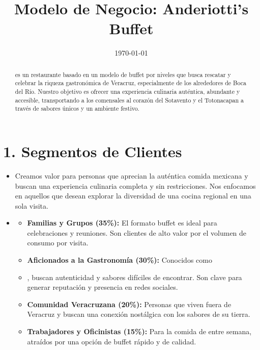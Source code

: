 \documentclass[12pt, letterpaper, twocolumn]{article}
\title{\textbf{Modelo de Negocio: Anderiotti's Buffet}}
\date{\today}
\newcommand{\textit}[1]{\item[\textbf{--- #1}]} %
\begin{document}
\maketitle
\thispagestyle{empty}

\begin{abstract}
\noindent\textit{Anderiotti's Buffet} es un restaurante basado en un modelo de buffet por niveles que busca rescatar y celebrar la riqueza gastronómica de Veracruz, especialmente de los alrededores de Boca del Río. Nuestro objetivo es ofrecer una experiencia culinaria auténtica, abundante y accesible, transportando a los comensales al corazón del Sotavento y el Totonacapan a través de sabores únicos y un ambiente festivo.
\end{abstract}



\section*{1. Segmentos de Clientes}

\begin{itemize}
    \textit{¿Para quién creas valor?}
    Creamos valor para personas que aprecian la auténtica comida mexicana y buscan una experiencia culinaria completa y sin restricciones. Nos enfocamos en aquellos que desean explorar la diversidad de una cocina regional en una sola visita.

    \textit{¿Quiénes son tus clientes más importantes?}
    \begin{itemize}
        \item \textbf{Familias y Grupos (35\%):} El formato buffet es ideal para celebraciones y reuniones. Son clientes de alto valor por el volumen de consumo por visita.
        \item \textbf{Aficionados a la Gastronomía (30\%):} Conocidos como \textit{foodies}, buscan autenticidad y sabores difíciles de encontrar. Son clave para generar reputación y presencia en redes sociales.
        \item \textbf{Comunidad Veracruzana (20\%):} Personas que viven fuera de Veracruz y buscan una conexión nostálgica con los sabores de su tierra.
        \item \textbf{Trabajadores y Oficinistas (15\%):} Para la comida de entre semana, atraídos por una opción de buffet rápido y de calidad.
    \end{itemize}
\end{itemize}
\end{document}
